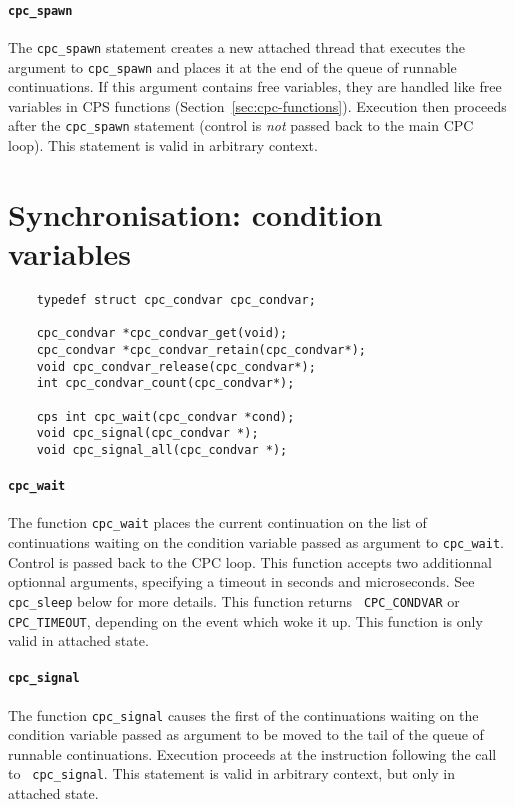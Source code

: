 \documentclass[a4paper]{report}
\begin{document}
\paragraph{\tt cpc\_spawn} The {\tt cpc\_spawn} statement creates a new
attached thread that executes the argument to {\tt cpc\_spawn} and
places it at the end of the queue of runnable continuations.  If this
argument contains free variables, they are handled like free variables
in CPS functions (Section~\ref{sec:cpc-functions}). Execution then
proceeds after the {\tt cpc\_spawn} statement (control is {\em not\/}
passed back to the main CPC loop).  This statement is valid in arbitrary
context.

\section{Synchronisation: condition variables}

\begin{verbatim}
    typedef struct cpc_condvar cpc_condvar;

    cpc_condvar *cpc_condvar_get(void);
    cpc_condvar *cpc_condvar_retain(cpc_condvar*);
    void cpc_condvar_release(cpc_condvar*);
    int cpc_condvar_count(cpc_condvar*);

    cps int cpc_wait(cpc_condvar *cond);
    void cpc_signal(cpc_condvar *);
    void cpc_signal_all(cpc_condvar *);
\end{verbatim}

\paragraph{\tt cpc\_wait} The function {\tt cpc\_wait} places the
current continuation on the list of continuations waiting on the
condition variable passed as argument to {\tt cpc\_wait}.  Control is
passed back to the CPC loop.  This function accepts two additionnal
optionnal arguments, specifying a timeout in seconds and microseconds.  
See {\tt cpc\_sleep} below for more details.  This function returns {\tt
CPC\_CONDVAR} or {\tt CPC\_TIMEOUT}, depending on the event which woke
it up.  This function is only valid in attached state.

\paragraph{\tt cpc\_signal} The function {\tt cpc\_signal} causes the
first of the continuations waiting on the condition variable passed as
argument to be moved to the tail of the queue of runnable continuations.
Execution proceeds at the instruction following the call to {\tt
  cpc\_signal}.  This statement is valid in arbitrary context, but only in
attached state.
\end{document}
